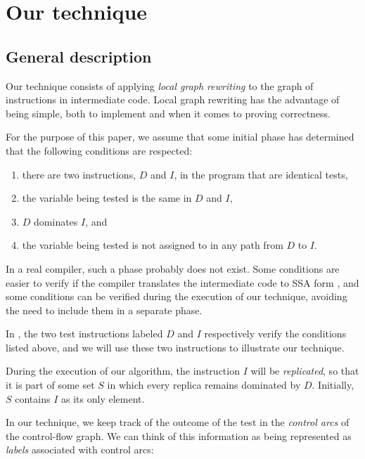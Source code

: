 \section{Our technique}

\subsection{General description}
\label{sec-our-technique-general-description}

Our technique consists of applying \emph{local graph rewriting} to the
graph of instructions in intermediate code.  Local graph rewriting has
the advantage of being simple, both to implement and when it comes to
proving correctness.

For the purpose of this paper, we assume that some initial phase has
determined that the following conditions are respected:

\begin{enumerate}
\item there are two instructions, $D$ and $I$, in the program that
  are identical tests,
\item the variable being tested is the same in $D$ and $I$,
\item $D$ dominates $I$, and
\item the variable being tested is not assigned to in any path from
  $D$ to $I$.
\end{enumerate}

In a real compiler, such a phase probably does not exist.  Some
conditions are easier to verify if the compiler translates the
intermediate code to SSA form \cite{Cytron:1989:EMC:75277.75280,
  Cytron:1991:ECS:115372.115320}, and some conditions can be verified
during the execution of our technique, avoiding the need to include
them in a separate phase.

In , the two test instructions labeled $D$
and $I$ respectively verify the conditions listed above, and we will
use these two instructions to illustrate our technique.

During the execution of our algorithm, the instruction $I$ will be
\emph{replicated}, so that it is part of some set $S$ in which every
replica remains dominated by $D$.  Initially, $S$ contains $I$ as its
only element.

In our technique, we keep track of the outcome of the test in the
\emph{control arcs} of the control-flow graph.  We can think of this
information as being represented as \emph{labels} associated with
control arcs:

